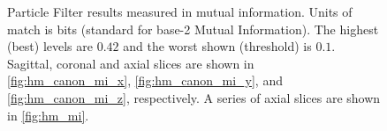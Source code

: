 \begin{figure}[H]
\centering
{}
\caption{Particle Filter results measured in mutual information.
         Units of match is bits (standard for base-2 Mutual Information). The highest (best) levels are
         $0.42$ and the worst shown (threshold) is $0.1$.
        Sagittal, coronal and axial slices are shown in \autoref{fig:hm_canon_mi_x},
        \autoref{fig:hm_canon_mi_y}, and \autoref{fig:hm_canon_mi_z}, respectively.
        A series of axial slices are shown in \autoref{fig:hm_mi}.  }
\label{fig:hm_canon_pfilter_mi}
\end{figure}

